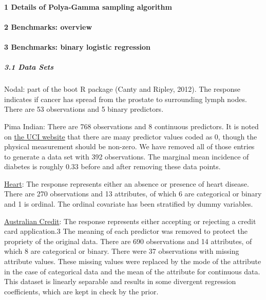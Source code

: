 \documentclass[
]{article}
\begin{document}
\hypertarget{details-of-polya-gamma-sampling-algorithm}{%
\paragraph{1 Details of Polya-Gamma sampling
algorithm}\label{details-of-polya-gamma-sampling-algorithm}}

\hypertarget{benchmarks-overview}{%
\paragraph{2 Benchmarks: overview}\label{benchmarks-overview}}

\hypertarget{benchmarks-binary-logistic-regression}{%
\paragraph{3 Benchmarks: binary logistic
regression}\label{benchmarks-binary-logistic-regression}}

\hypertarget{data-sets}{%
\subparagraph{3.1 Data Sets}\label{data-sets}}

Nodal: part of the boot R package (Canty and Ripley, 2012). The response
indicates if cancer has spread from the prostate to surrounding lymph
nodes. There are 53 observations and 5 binary predictors.

Pima Indian: There are 768 observations and 8 continuous predictors. It
is noted on
\href{http://archive.ics.uci.edu/ml/datasets/Pima+Indians+Diabetes}{the
UCI website} that there are many predictor values coded as 0, though the
physical measurement should be non-zero. We have removed all of those
entries to generate a data set with 392 observations. The marginal mean
incidence of diabetes is roughly 0.33 before and after removing these
data points.

\href{http://archive.ics.uci.edu/ml/datasets/Statlog+(Heart)}{Heart}:
The response represents either an absence or presence of heart disease.
There are 270 observations and 13 attributes, of which 6 are categorical
or binary and 1 is ordinal. The ordinal covariate has been stratified by
dummy variables.

\href{http://archive.ics.uci.edu/ml/datasets/Statlog+(Australian+Credit+Approval)}{Australian
Credit}: The response represents either accepting or rejecting a credit
card application.3 The meaning of each predictor was removed to protect
the propriety of the original data. There are 690 observations and 14
attributes, of which 8 are categorical or binary. There were 37
observations with missing attribute values. These missing values were
replaced by the mode of the attribute in the case of categorical data
and the mean of the attribute for continuous data. This dataset is
linearly separable and results in some divergent regression
coefficients, which are kept in check by the prior.
\end{document}
